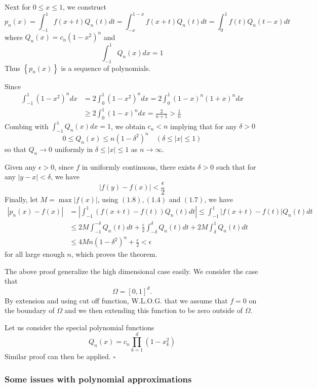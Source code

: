 \documentclass[10pt]{article}
\begin{document}
Next for $0 \leq x \leq 1$, we construct
$$
p_{n}(x)=\int_{-1}^{1} f(x+t) Q_{n}(t) d t=\int_{-x}^{1-x} f(x+t) Q_{n}(t) d t=\int_{0}^{1} f(t) Q_{n}(t-x) d t
$$
where $Q_{n}(x)=c_{n}\left(1-x^{2}\right)^{n}$ and
$$
\int_{-1}^{1} Q_{n}(x) d x=1
$$
Thus $\left\{p_{n}(x)\right\}$ is a sequence of polynomials.

Since
$$
\begin{aligned}
\int_{-1}^{1}\left(1-x^{2}\right)^{n} d x &=2 \int_{0}^{1}\left(1-x^{2}\right)^{n} d x=2 \int_{0}^{1}(1-x)^{n}(1+x)^{n} d x \\
& \geq 2 \int_{0}^{1}(1-x)^{n} d x=\frac{2}{n+1}>\frac{1}{n}
\end{aligned}
$$
Combing with $\int_{-1}^{1} Q_{n}(x) d x=1$, we obtain $c_{n}<n$ implying that for any $\delta>0$
$$
0 \leq Q_{n}(x) \leq n\left(1-\delta^{2}\right)^{n} \quad(\delta \leq|x| \leq 1)
$$
so that $Q_{n} \rightarrow 0$ uniformly in $\delta \leq|x| \leq 1$ as $n \rightarrow \infty$.

Given any $\epsilon>0$, since $f$ in uniformly continuous, there exists $\delta>0$ such that for any $|y-x|<\delta$, we have
$$
|f(y)-f(x)|<\frac{\epsilon}{2}
$$
Finally, let $M=\max |f(x)|$, using $(1.8),(1.4)$ and $(1.7)$, we have
$$
\begin{aligned}
\left|p_{n}(x)-f(x)\right| &=\left|\int_{-1}^{1}(f(x+t)-f(t)) Q_{n}(t) d t\right| \leq \int_{-1}^{1}|f(x+t)-f(t)| Q_{n}(t) d t \\
& \leq 2 M \int_{-1}^{-\delta} Q_{n}(t) d t+\frac{\epsilon}{2} \int_{-\delta}^{\delta} Q_{n}(t) d t+2 M \int_{\delta}^{1} Q_{n}(t) d t \\
& \leq 4 M n\left(1-\delta^{2}\right)^{n}+\frac{\epsilon}{2}<\epsilon
\end{aligned}
$$
for all large enough $n$, which proves the theorem.

The above proof generalize the high dimensional case easily. We consider the case that
$$
\Omega=[0,1]^{d} .
$$
By extension and using cut off function, W.L.O.G. that we assume that $f=0$ on the boundary of $\Omega$ and we then extending this function to be zero outside of $\Omega$.

Let us consider the special polynomial functions
$$
Q_{n}(x)=c_{n} \prod_{k=1}^{d}\left(1-x_{k}^{2}\right)
$$
Similar proof can then be applied. $\square$

\subsubsection{Some issues with polynomial approximations}
\end{document}

